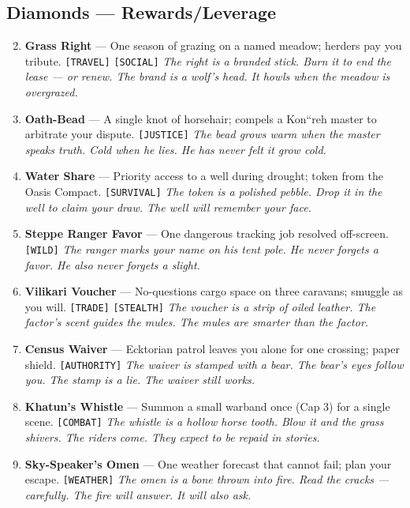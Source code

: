 {{\subsection*{Diamonds --- Rewards/Leverage}
\label{sec:midh-ahkaz-rewards}
\begin{enumerate}
\setcounter{enumi}{1}
\item {} \textbf{Grass Right} --- One season of grazing on a named meadow; herders pay you tribute. \texttt{[TRAVEL]} \texttt{[SOCIAL]} \hfill \textit{The right is a branded stick. Burn it to end the lease --- or renew. The brand is a wolf's head. It howls when the meadow is overgrazed.}
\item {} \textbf{Oath-Bead} --- A single knot of horsehair; compels a Kon``reh master to arbitrate your dispute. \texttt{[JUSTICE]} \hfill \textit{The bead grows warm when the master speaks truth. Cold when he lies. He has never felt it grow cold.}
\item {} \textbf{Water Share} --- Priority access to a well during drought; token from the Oasis Compact. \texttt{[SURVIVAL]} \hfill \textit{The token is a polished pebble. Drop it in the well to claim your draw. The well will remember your face.}
\item {} \textbf{Steppe Ranger Favor} --- One dangerous tracking job resolved off-screen. \texttt{[WILD]} \hfill \textit{The ranger marks your name on his tent pole. He never forgets a favor. He also never forgets a slight.}
\item {} \textbf{Vilikari Voucher} --- No-questions cargo space on three caravans; smuggle as you will. \texttt{[TRADE]} \texttt{[STEALTH]} \hfill \textit{The voucher is a strip of oiled leather. The factor's scent guides the mules. The mules are smarter than the factor.}
\item {} \textbf{Census Waiver} --- Ecktorian patrol leaves you alone for one crossing; paper shield. \texttt{[AUTHORITY]} \hfill \textit{The waiver is stamped with a bear. The bear's eyes follow you. The stamp is a lie. The waiver still works.}
\item {} \textbf{Khatun's Whistle} --- Summon a small warband once (Cap 3) for a single scene. \texttt{[COMBAT]} \hfill \textit{The whistle is a hollow horse tooth. Blow it and the grass shivers. The riders come. They expect to be repaid in stories.}
\item {} \textbf{Sky-Speaker's Omen} --- One weather forecast that cannot fail; plan your escape. \texttt{[WEATHER]} \hfill \textit{The omen is a bone thrown into fire. Read the cracks --- carefully. The fire will answer. It will also ask.}

\end{enumerate}}}
